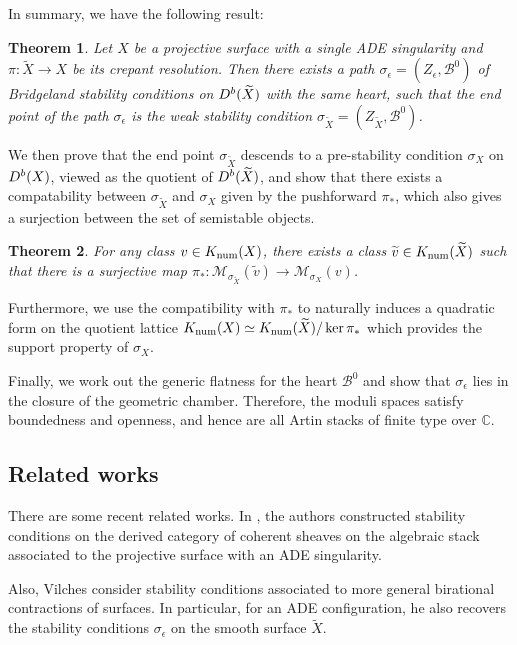 \documentclass[12pt]{amsart}
\newtheorem{theorem}{Theorem}[section]
\theoremstyle{definition}
\DeclareMathOperator{\num}{num}
\begin{document}
In summary, we have the following result:
\begin{theorem}
Let $X$ be a projective surface with a single ADE singularity and $\pi \colon \widetilde{X} \longrightarrow X$ be its crepant resolution. 
Then there exists a path $\sigma_\epsilon = (Z_\epsilon, \mathcal{B}^0)$ of Bridgeland stability conditions on ${\rm D}^b(\widetilde{X})$ with the same heart,
such that the end point of the path $\sigma_\epsilon$ is the weak stability condition $\sigma_{\widetilde{X}} = (Z_{\widetilde{X}},\mathcal{B}^0)$.
\end{theorem}

We then prove that the end point $\sigma_{\widetilde{X}}$ descends to a pre-stability condition $\sigma_X$ on ${\rm D}^b(X)$, viewed as the quotient of ${\rm D}^b(\widetilde{X})$, 
and show that there exists a compatability between $\sigma_{\widetilde{X}}$ and $\sigma_X$ given by the pushforward $\pi_\ast$, which also gives a surjection between the set of semistable objects.

\begin{theorem}\label{main3}
For any class $v \in {\rm K}_{\num}(X)$, there exists a class $\widetilde{v} \in {\rm K}_{\num}(\widetilde{X})$ such that there is a surjective map $\pi_\ast \colon \mathcal{M}_{\sigma_{\widetilde{X}}}(\widetilde{v}) \longrightarrow \mathcal{M}_{\sigma_X}(v)$.
\end{theorem}


Furthermore, we use the compatibility with $\pi_\ast$ to naturally induces a quadratic form on the quotient lattice ${\rm K}_{\num}(X) \simeq {\rm K}_{\num}(\widetilde{X})/ \ker \pi_\ast$ which provides the support property of $\sigma_X$.

Finally, we work out the generic flatness for the heart $\mathcal{B}^0$ 
and show that $\sigma_\epsilon$ lies in the closure of the geometric chamber.
Therefore, the moduli spaces satisfy boundedness and openness, and hence are all Artin stacks of
finite type over $\mathbb{C}$.

\subsection{Related works}
There are some recent related works.
In \cite{LR22}, the authors constructed stability conditions on the derived category of coherent sheaves on the algebraic stack associated to the projective surface with an ADE singularity.

Also, Vilches \cite{Vil25} consider stability conditions associated to more general birational contractions of surfaces.
In particular, for an ADE configuration,
he also recovers the stability conditions
$\sigma_\epsilon$ on the smooth surface $\widetilde{X}$.
\end{document}
